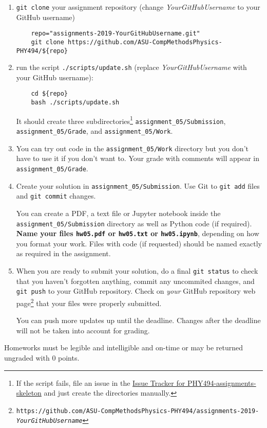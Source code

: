 \documentclass[letterpaper]{scrartcl}
\newcommand{\anumber}{5}
\newcommand{\anum}{0\anumber}
\begin{document}
\begin{enumerate}
\item \texttt{git clone} your assignment repository (change
  \emph{YourGitHubUsername} to your GitHub username)
  \begin{verbatim}
    repo="assignments-2019-YourGitHubUsername.git" 
    git clone https://github.com/ASU-CompMethodsPhysics-PHY494/${repo}
  \end{verbatim}
\item run the script
  \texttt{./scripts/update.sh} (replace \emph{YourGitHubUsername} with
  your GitHub username):
  \begin{verbatim}
    cd ${repo} 
    bash ./scripts/update.sh
  \end{verbatim}
  It should create three subdirectories\footnote{If the script fails,
    file an issue in the
    \href{https://github.com/ASU-CompMethodsPhysics-PHY494/PHY494-assignments-skeleton/issues}{Issue
      Tracker for PHY494-assignments-skeleton} and just create the
    directories manually.} \texttt{assignment\_\anum/Submission},
  \texttt{assignment\_\anum/Grade}, and
  \texttt{assignment\_\anum/Work}.
\item You can try out code in the \texttt{assignment\_\anum/Work}
  directory but you don't have to use it if you don't want to. Your
  grade with comments will appear in
  \texttt{assignment\_\anum/Grade}.
\item Create your solution in
  \texttt{assignment\_\anum/Submission}. Use Git to \texttt{git
    add} files and \texttt{git commit} changes.

  You can create a PDF, a text file or Jupyter notebook inside the
  \texttt{assignment\_\anum/Submission} directory as well as Python
  code (if required). \textbf{Name your files \texttt{hw\anum.pdf} or
    \texttt{hw\anum.txt} or \texttt{hw\anum.ipynb}}, depending on how
  you format your work. Files with code (if requested) should be named
  exactly as required in the assignment.
\item When you are ready to submit your solution, do a final
  \texttt{git status} to check that you haven't forgotten anything,
  commit any uncommited changes, and \texttt{git push} to your GitHub
  repository. Check on \emph{your} GitHub repository web
  page\footnote{\texttt{https://github.com/ASU-CompMethodsPhysics-PHY494/assignments-2019-\emph{YourGitHubUsername}}}
  that your files were properly submitted.

  You can push more updates up until the deadline. Changes after the
  deadline will not be taken into account for grading.
\end{enumerate}
Homeworks must be legible and intelligible and on-time or may  be
returned ungraded with 0 points.
\end{document}
